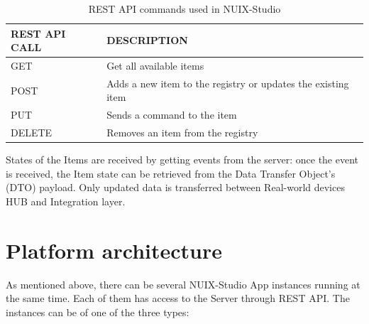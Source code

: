 \begin{table}
  \centering
  \begin{threeparttable}[c]
    \caption{REST API commands used in NUIX-Studio}
    \label{tab:rest-api-table}
    \begin{tabular}{ll}
      \toprule
      REST API CALL    &         DESCRIPTION                 \\
      \midrule
      GET\tnote{a} & Get all available items \\
      POST\tnote{b} & Adds a new item to the registry or updates the existing item    \\
      PUT\tnote{b}        & Sends a command to the item                              \\
      DELETE\tnote{b}        & Removes an item from the registry          \\
      \bottomrule
    \end{tabular}
  \end{threeparttable}
\end{table}

States of the Items are received by getting events from the server: once the event is received, the Item state can be retrieved from the Data Transfer Object's (DTO) payload. Only updated data is transferred between Real-world devices HUB and Integration layer. 


\section{Platform architecture}

As mentioned above, there can be several NUIX-Studio App instances running at the same time. Each of them has access to the Server through REST API. The instances can be of one of the three types:


